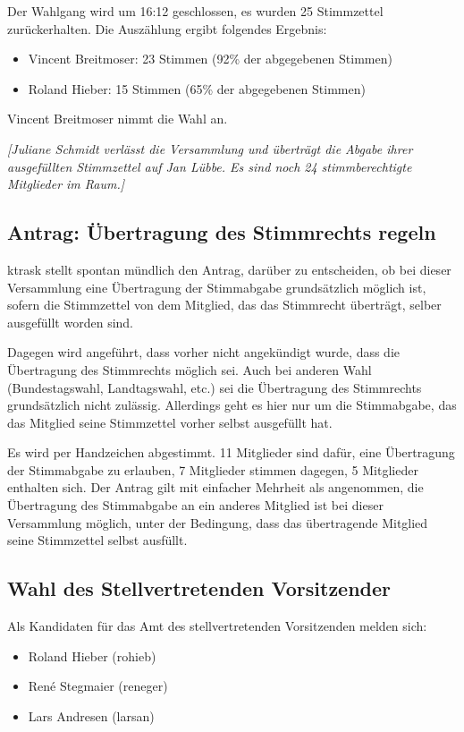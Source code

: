 \documentclass[a4paper,12pt]{scrartcl}
\begin{document}
Der Wahlgang wird um 16:12 geschlossen, es wurden 25 Stimmzettel zurückerhalten.
Die Auszählung ergibt folgendes Ergebnis:

\begin{itemize}
  \item Vincent Breitmoser: 23 Stimmen (92\% der abgegebenen Stimmen)
  \item Roland Hieber: 15 Stimmen (65\% der abgegebenen Stimmen)
\end{itemize}

Vincent Breitmoser nimmt die Wahl an.

\emph{[Juliane Schmidt verlässt die Versammlung und überträgt die Abgabe ihrer
ausgefüllten Stimmzettel auf Jan Lübbe. Es sind noch 24 stimmberechtigte
Mitglieder im Raum.]}

\subsection{Antrag: Übertragung des Stimmrechts regeln}
ktrask stellt spontan mündlich den Antrag, darüber zu entscheiden, ob bei dieser
Versammlung eine Übertragung der Stimmabgabe grundsätzlich möglich ist, sofern
die Stimmzettel von dem Mitglied, das das Stimmrecht überträgt, selber
ausgefüllt worden sind.

Dagegen wird angeführt, dass vorher nicht angekündigt wurde, dass die
Übertragung des Stimmrechts möglich sei. Auch bei anderen Wahl (Bundestagswahl,
Landtagswahl, etc.) sei die Übertragung des Stimmrechts grundsätzlich nicht
zulässig. Allerdings geht es hier nur um die Stimmabgabe, das das Mitglied seine
Stimmzettel vorher selbst ausgefüllt hat.

Es wird per Handzeichen abgestimmt. 11 Mitglieder sind dafür, eine Übertragung
der Stimmabgabe zu erlauben, 7 Mitglieder stimmen dagegen, 5 Mitglieder
enthalten sich. Der Antrag gilt mit einfacher Mehrheit als angenommen, die
Übertragung des Stimmabgabe an ein anderes Mitglied ist bei dieser Versammlung
möglich, unter der Bedingung, dass das übertragende Mitglied seine Stimmzettel
selbst ausfüllt.

\subsection{Wahl des Stellvertretenden Vorsitzender}
Als Kandidaten für das Amt des stellvertretenden Vorsitzenden melden sich:
\begin{itemize}
  \item Roland Hieber (rohieb)
  \item René Stegmaier (reneger)
  \item Lars Andresen (larsan)
\end{itemize}
\end{document}
